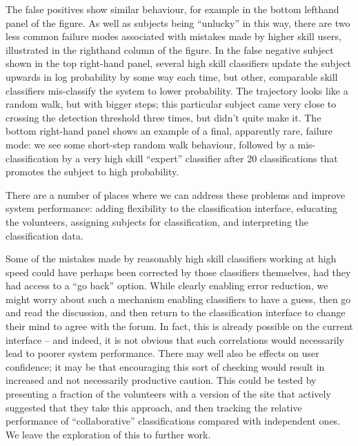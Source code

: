 \documentclass[useAMS,usenatbib,a4paper]{mn2e}
\begin{document}
The false positives show similar behaviour, for example in the bottom lefthand
panel of the figure. As well as subjects being ``unlucky'' in this way, there
are two less common failure modes associated with mistakes made by higher skill
users, illustrated in the righthand column of the figure. In the false negative
subject shown in the top right-hand panel, several high skill classifiers update
the subject upwards in log probability by some way each time, but other,
comparable skill classifiers mis-classify the system to lower probability.   The
trajectory looks like a random walk, but with bigger steps; this particular
subject came very close to crossing the detection  threshold three times, but
didn't quite make it. The bottom right-hand panel shows an example of a final,
apparently rare, failure mode: we see some short-step random walk behaviour,
followed by a mis-classification by a very high skill ``expert'' classifier
after 20 classifications that promotes the subject to high probability.

There are a number of places where we can address these problems and
improve system performance: adding flexibility to the classification
interface, educating the volunteers, assigning subjects for
classification, and interpreting the classification data.

Some of  the mistakes made by reasonably high skill classifiers working at high
speed could have perhaps been corrected by those classifiers themselves, had
they had access to a ``go back'' option. While clearly enabling error reduction,
we might worry about such a mechanism enabling classifiers to have a guess, then
go and read the \Talk discussion, and then return to the classification
interface to change their mind to agree with the forum. In fact, this is already
possible on the current interface -- and indeed, it is not obvious that such
correlations would necessarily lead to poorer system performance. There may well
also be effects on user confidence; it may be that encouraging this sort of
checking would result in increased and not necessarily productive caution. This
could be tested by presenting a fraction of the volunteers with a version of the
site that actively suggested that they take this approach, and then tracking the
relative performance of ``collaborative'' classifications compared with
independent ones. We leave the exploration of this to further work.
\end{document}
